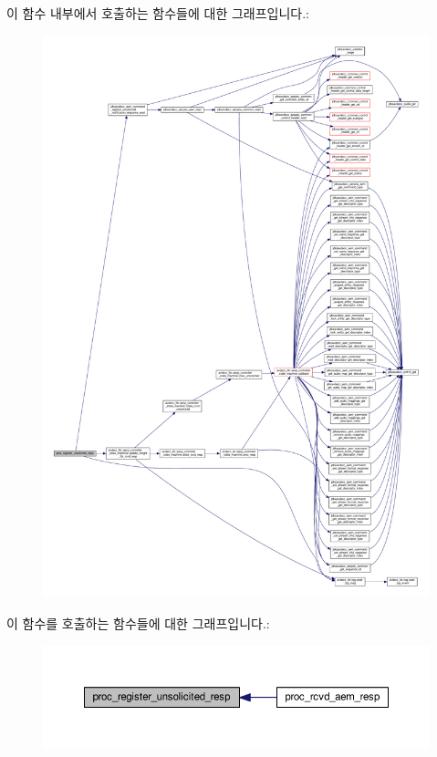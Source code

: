 이 함수 내부에서 호출하는 함수들에 대한 그래프입니다.\+:
\nopagebreak
\begin{figure}[H]
\begin{center}
\leavevmode
\includegraphics[width=350pt]{classavdecc__lib_1_1end__station__imp_a151a0d143ccb4f721fb4e89bb25ab049_cgraph}
\end{center}
\end{figure}




이 함수를 호출하는 함수들에 대한 그래프입니다.\+:
\nopagebreak
\begin{figure}[H]
\begin{center}
\leavevmode
\includegraphics[width=350pt]{classavdecc__lib_1_1end__station__imp_a151a0d143ccb4f721fb4e89bb25ab049_icgraph}
\end{center}
\end{figure}


